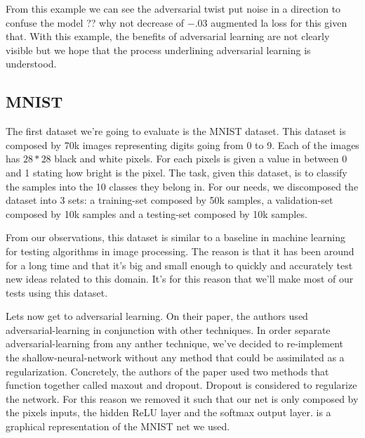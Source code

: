 		From this example we can see the adversarial twist put noise in a direction to confuse the model ?? why not decrease of $-.03$ augmented la loss for this given that.
		With this example, the benefits of adversarial learning are not clearly visible but we hope that the process underlining adversarial learning is understood.



	\subsection{MNIST}
	\label{sub:MNIST}
		
		The first dataset we're going to evaluate is the MNIST dataset\cite{lecun-mnist}. This dataset is composed by 70k images representing digits going from 0 to 9. Each of the images has $28*28$ black and white pixels. For each pixels is given a value in between 0 and 1 stating how bright is the pixel. The task, given this dataset, is to classify the samples into the 10 classes they belong in. For our needs, we discomposed the dataset into 3 sets: a training-set composed by 50k samples, a validation-set composed by 10k samples and a testing-set composed by 10k samples. 

		From our observations, this dataset is similar to a baseline in machine learning for testing algorithms in image processing. The reason is that it has been around for a long time and that it's big and small enough to quickly and accurately test new ideas related to this domain. It's for this reason that we'll make most of our tests using this dataset.

		Lets now get to adversarial learning. On their paper\cite{goodfellow2014explaining}, the authors used adversarial-learning in conjunction with other techniques. In order separate adversarial-learning from any anther technique, we've decided to re-implement the shallow-neural-network without any method that could be assimilated as a regularization. Concretely, the authors of the paper used two methods that function together called maxout and dropout. Dropout is considered to regularize the network. For this reason we removed it such that our net is only composed by the pixels inputs, the hidden ReLU layer and the softmax output layer.  is a graphical representation of the MNIST net we used.


